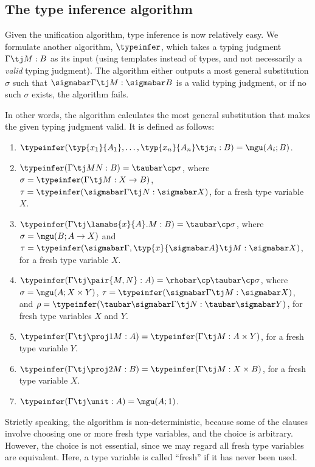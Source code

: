 \documentclass[12pt]{article}
\begin{document}
\subsection{The type inference algorithm}

Given the unification algorithm, type inference is now relatively
easy. We formulate another algorithm, $\typeinfer$, which takes a
typing judgment $\Gamma\tj M:B$ as its input (using templates instead
of types, and not necessarily a {\em valid} typing judgment). The
algorithm either outputs a most general substitution $\sigma$ such
that $\sigmabar\Gamma\tj M:\sigmabar B$ is a valid typing judgment, or
if no such $\sigma$ exists, the algorithm fails.

In other words, the algorithm calculates the most general substitution
that makes the given typing judgment valid. It is defined as follows:

\begin{enumerate}
\item $\typeinfer(\typ{x_1}{A_1},\ldots,\typ{x_n}{A_n}\tj x_i:B) =
  \mgu(A_i;B)$.
\item $\typeinfer(\Gamma\tj MN:B)= \taubar\cp\sigma$, where
  $\sigma=\typeinfer(\Gamma\tj M:X\to B)$,
  $\tau=\typeinfer(\sigmabar\Gamma\tj N:\sigmabar X)$, for a fresh
  type variable $X$.
\item $\typeinfer(\Gamma\tj\lamabs{x}{A}.M:B)=\taubar\cp\sigma$, where
  $\sigma=\mgu(B;A\to X)$ and
  $\tau=\typeinfer(\sigmabar\Gamma,\typ{x}{\sigmabar A}\tj M:\sigmabar
  X)$, for a fresh type variable $X$.
\item $\typeinfer(\Gamma\tj\pair{M,N}:A) =
  \rhobar\cp\taubar\cp\sigma$, where $\sigma=\mgu(A;X\times Y)$,
  $\tau=\typeinfer(\sigmabar\Gamma\tj M:\sigmabar X)$, and
  $\rho=\typeinfer(\taubar\sigmabar\Gamma\tj N:\taubar\sigmabar Y)$,
  for fresh type variables $X$ and $Y$.
\item $\typeinfer(\Gamma\tj\proj1 M:A) = \typeinfer(\Gamma\tj
  M:A\times Y)$, for a fresh type variable $Y$.
\item $\typeinfer(\Gamma\tj\proj2 M:B) = \typeinfer(\Gamma\tj
  M:X\times B)$, for a fresh type variable $X$.
\item $\typeinfer(\Gamma\tj\unit:A) = \mgu(A;1)$.
\end{enumerate}

Strictly speaking, the algorithm is non-deterministic, because some of
the clauses involve choosing one or more fresh type variables, and the
choice is arbitrary. However, the choice is not essential, since we
may regard all fresh type variables are equivalent. Here, a type
variable is called ``fresh'' if it has never been used.
\end{document}

